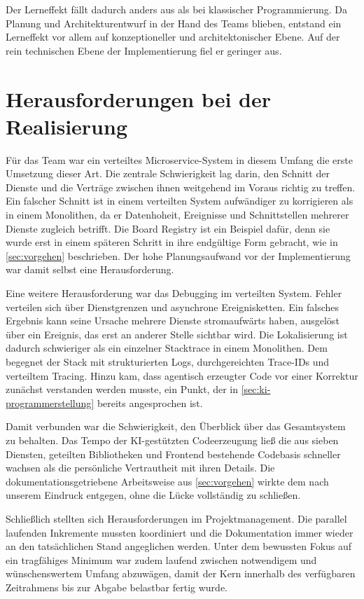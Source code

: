 Der Lerneffekt fällt dadurch anders aus als bei klassischer Programmierung. Da Planung und Architekturentwurf in der Hand des Teams blieben, entstand ein Lerneffekt vor allem auf konzeptioneller und architektonischer Ebene. Auf der rein technischen Ebene der Implementierung fiel er geringer aus.

\section{Herausforderungen bei der Realisierung}
\label{sec:herausforderungen}

Für das Team war ein verteiltes Microservice-System in diesem Umfang die erste Umsetzung dieser Art. Die zentrale Schwierigkeit lag darin, den Schnitt der Dienste und die Verträge zwischen ihnen weitgehend im Voraus richtig zu treffen. Ein falscher Schnitt ist in einem verteilten System aufwändiger zu korrigieren als in einem Monolithen, da er Datenhoheit, Ereignisse und Schnittstellen mehrerer Dienste zugleich betrifft. Die Board Registry ist ein Beispiel dafür, denn sie wurde erst in einem späteren Schritt in ihre endgültige Form gebracht, wie in \vref{sec:vorgehen} beschrieben. Der hohe Planungsaufwand vor der Implementierung war damit selbst eine Herausforderung.

Eine weitere Herausforderung war das Debugging im verteilten System. Fehler verteilen sich über Dienstgrenzen und asynchrone Ereignisketten. Ein falsches Ergebnis kann seine Ursache mehrere Dienste stromaufwärts haben, ausgelöst über ein Ereignis, das erst an anderer Stelle sichtbar wird. Die Lokalisierung ist dadurch schwieriger als ein einzelner Stacktrace in einem Monolithen. Dem begegnet der Stack mit strukturierten Logs, durchgereichten Trace-IDs und verteiltem Tracing. Hinzu kam, dass agentisch erzeugter Code vor einer Korrektur zunächst verstanden werden musste, ein Punkt, der in \vref{sec:ki-programmerstellung} bereits angesprochen ist.

Damit verbunden war die Schwierigkeit, den Überblick über das Gesamtsystem zu behalten. Das Tempo der KI-gestützten Codeerzeugung ließ die aus sieben Diensten, geteilten Bibliotheken und Frontend bestehende Codebasis schneller wachsen als die persönliche Vertrautheit mit ihren Details. Die dokumentationsgetriebene Arbeitsweise aus \vref{sec:vorgehen} wirkte dem nach unserem Eindruck entgegen, ohne die Lücke vollständig zu schließen.

Schließlich stellten sich Herausforderungen im Projektmanagement. Die parallel laufenden Inkremente mussten koordiniert und die Dokumentation immer wieder an den tatsächlichen Stand angeglichen werden. Unter dem bewussten Fokus auf ein tragfähiges Minimum war zudem laufend zwischen notwendigem und wünschenswertem Umfang abzuwägen, damit der Kern innerhalb des verfügbaren Zeitrahmens bis zur Abgabe belastbar fertig wurde.
